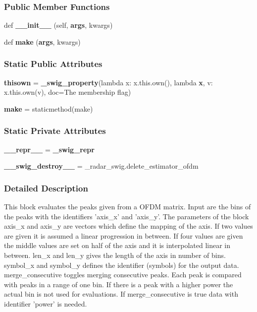 \subsubsection*{Public Member Functions}
\begin{DoxyCompactItemize}
\item 
def {\bf \+\_\+\+\_\+init\+\_\+\+\_\+} (self, {\bf args}, kwargs)
\item 
def {\bf make} ({\bf args}, kwargs)
\end{DoxyCompactItemize}
\subsubsection*{Static Public Attributes}
\begin{DoxyCompactItemize}
\item 
{\bf thisown} = {\bf \+\_\+swig\+\_\+property}(lambda x\+: x.\+this.\+own(), lambda {\bf x}, v\+: x.\+this.\+own(v), doc=\textquotesingle{}The membership flag\textquotesingle{})
\item 
{\bf make} = staticmethod(make)
\end{DoxyCompactItemize}
\subsubsection*{Static Private Attributes}
\begin{DoxyCompactItemize}
\item 
{\bf \+\_\+\+\_\+repr\+\_\+\+\_\+} = {\bf \+\_\+swig\+\_\+repr}
\item 
{\bf \+\_\+\+\_\+swig\+\_\+destroy\+\_\+\+\_\+} = \+\_\+radar\+\_\+swig.\+delete\+\_\+estimator\+\_\+ofdm
\end{DoxyCompactItemize}


\subsubsection{Detailed Description}
\begin{DoxyVerb}This block evaluates the peaks given from a OFDM matrix. Input are the bins of the peaks with the identifiers 'axis_x' and 'axis_y'. The parameters of the block axis_x and axis_y are vectors which define the mapping of the axis. If two values are given it is assumed a linear progression in between. If four values are given the middle values are set on half of the axis and it is interpolated linear in between. len_x and len_y gives the length of the axis in number of bins. symbol_x and symbol_y defines the identifier (symbols) for the output data. merge_consecutive toggles merging consecutive peaks. Each peak is compared with peaks in a range of one bin. If there is a peak with a higher power the actual bin is not used for evaluations. If merge_consecutive is true data with identifier 'power' is needed.\end{DoxyVerb}
 

